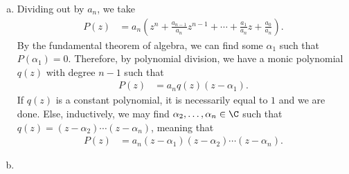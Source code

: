 \documentclass[10pt]{mypackage}
\begin{document}
\begin{solution}\hfill
  \begin{enumerate}[(a)]
    \item Dividing out by $a_n$, we take
      \begin{align*}
        P(z) &= a_n \left( z^{n} + \frac{a_{n-1}}{a_n}z^{n-1} + \cdots + \frac{a_1}{a_n}z + \frac{a_0}{a_n} \right).
      \end{align*}
      By the fundamental theorem of algebra, we can find some $\alpha_1$ such that $P\left( \alpha_1 \right) = 0$. Therefore, by polynomial division, we have a monic polynomial $q(z)$ with degree $n-1$ such that
      \begin{align*}
        P(z) &= a_n q(z)\left( z-\alpha_1 \right).
      \end{align*}
      If $q(z)$ is a constant polynomial, it is necessarily equal to $1$ and we are done. Else, inductively, we may find $\alpha_2,\dots,\alpha_n\in \C$ such that $q(z) = \left( z-\alpha_2 \right)\cdots \left( z-\alpha_n \right)$, meaning that
      \begin{align*}
        P(z) &= a_n\left( z-\alpha_1 \right)\left( z-\alpha_2 \right)\cdots \left( z-\alpha_n \right).
      \end{align*}
    \item 
  \end{enumerate}
\end{solution}
\end{document}
